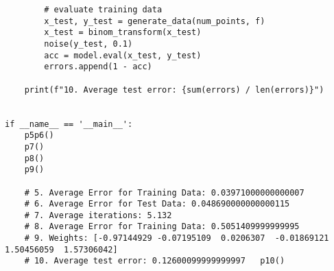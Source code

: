 \documentclass[answers]{exam}
\begin{document}
\begin{verbatim}
        # evaluate training data
        x_test, y_test = generate_data(num_points, f)
        x_test = binom_transform(x_test)
        noise(y_test, 0.1)
        acc = model.eval(x_test, y_test)
        errors.append(1 - acc)

    print(f"10. Average test error: {sum(errors) / len(errors)}")


if __name__ == '__main__':
    p5p6()
    p7()
    p8()
    p9()

    # 5. Average Error for Training Data: 0.03971000000000007
    # 6. Average Error for Test Data: 0.048690000000000115
    # 7. Average iterations: 5.132
    # 8. Average Error for Training Data: 0.5051409999999995
    # 9. Weights: [-0.97144929 -0.07195109  0.0206307  -0.01869121  1.50456059  1.57306042]
    # 10. Average test error: 0.12600099999999997   p10()
\end{verbatim}
\end{document}
